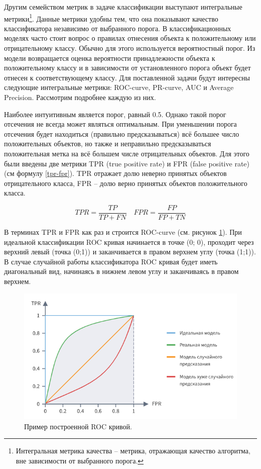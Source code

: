 \documentclass[a4paper,12pt]{extarticle}
\begin{document}
Другим семейством метрик в задаче классификации выступают интегральные метрики\footnote{Интегральная метрика качества – метрика, отражающая качество алгоритма, вне зависимости от выбранного порога.}. Данные метрики удобны тем, что она показывают качество классификатора независимо от выбранного порога. В классификационных моделях часто стоит вопрос о правилах отнесения объекта к положительному или отрицательному классу. Обычно для этого используется вероятностный порог. Из модели возвращается оценка вероятности принадлежности объекта к положительному классу и в зависимости от установленного порога объект будет отнесен к соответствующему классу. Для поставленной задачи будут интересны следующие интегральные метрики: ROC-curve, PR-curve, AUC и Average Precision. Рассмотрим подробнее каждую из них.

Наиболее интуитивным является порог, равный 0.5. Однако такой порог отсечения не всегда может являться оптимальным. При уменьшении порога отсечения будет находиться (правильно предсказываться) всё большее число положительных объектов, но также и неправильно предсказываться положительная метка на всё большем числе отрицательных объектов. Для этого были введены две метрики TPR (true positive rate) и FPR (false positive rate) (см формулу \ref{tpr-fpr}). TPR отражает долю неверно принятых объектов отрицательного класса, FPR – долю верно принятых объектов положительного класса.

\begin{equation}
	\label{tpr-fpr}
	TPR = \frac{TP}{TP + FN} \quad FPR = \frac{FP}{FP + TN} 
\end{equation}

В терминах TPR и FPR как раз и строится ROC-curve (см. рисунок \ref{fig:roccurve}). При идеальной классификации ROC кривая начинается в точке (0; 0), проходит через верхний левый (точка (0;1)) и заканчивается в правом верхнем углу (точка (1;1)). В случае случайной работы классификатора ROC кривая будет иметь диагональный вид, начинаясь в нижнем левом углу и заканчиваясь в правом верхнем.

\begin{figure}[ht]
	\centering
	\includegraphics[scale=0.8]{roccurve.png}
	\caption{Пример построенной ROC кривой. \cite{https://loginom.ru/blog/classification-quality}}
	\label{fig:roccurve}
\end{figure}
\end{document}
